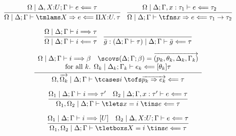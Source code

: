%
\[
  \begin{array}{c}
  \infer{%
    \belchkjudg{\Omega \mid \goalctx{}}{\tmlams X \bto e}{\Pi X{:}U.\, \tau}
  }{%
    \belchkjudg{\Omega \mid \Delta, X{:}U; \Gamma}{e}{\tau}
  }
  \quad
  \infer{%
    \belchkjudg{\Omega \mid \goalctx{}}{\tfns x \bto e}{\tau_1 \to \tau_2}
  }{%
    \belchkjudg{\Omega \mid \Delta; \Gamma, x : \tau_1}{e}{\tau_2}
  }
    \\[1em]
\infer{%
\belchkjudg{\Omega \mid \goalctx{}}{i}{\tau}}
{\belsynjudg{\Omega \mid \goalctx{}}{i}{\tau}}
    \quad
    \infer{%
      \belchkjudg{%
        \bar g : (\goalctx{} \proves \tau) \mid \goalctx{}
      }{\bar g}{\tau}
    }{}
\\[1em]
  \infer{%
    \belchkjudg{\Omega, \vec{\Omega_k} \mid \goalctx{}}{%
    \tcases i\;\tofs \vec{p_k \bto e_k}%
    }{\tau}
  }{%
    \begin{array}{c}
    \belsynjudg{\Omega \mid \goalctx{}}{i}{\beta}
      \quad
    \scovs (\Delta; \Gamma; \beta)
    = \vec{(p_k, \theta_k, \Delta_k, \Gamma_k)}
      \\
      \text{for all $k$. }
    \belchkjudg{\Omega_k \mid \goalctx{_k}}{e_k}{\msubst{\theta_k}{\tau}}
    \end{array}
  }

\\[1em]
 \infer{%
    \belchkjudg{\Omega_1, \Omega_2 \mid \goalctx{}}{\tlets x = i\;\tins e}{\tau}
  }{%
    \belsynjudg{\Omega_1 \mid \goalctx{}}{i}{\tau^\prime}
    &
    \belchkjudg{\Omega_2 \mid \Delta; \Gamma, x : \tau^\prime}{e}{\tau}
  }
      \\[1em]
  \infer{%
    \belchkjudg{\Omega_1, \Omega_2 \mid \goalctx{}}{\tletboxs X = i \;\tins e}{\tau}
  }{
    \belsynjudg{\Omega_1 \mid \goalctx{}}{i}{[U]}
    &
    \belchkjudg{\Omega_2 \mid \Delta, X{:}U; \Gamma}{e}{\tau}
  }
\end{array}
\]

